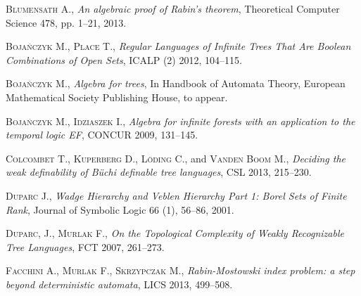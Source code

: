 \begin{thebibliography}{00}

\textsc{Blumensath} A., \emph{An algebraic proof of Rabin's theorem}, Theoretical Computer Science \textsc{478}, pp. 1--21, 2013.

\textsc{Boja\'nczyk} M., \textsc{Place} T., \emph{Regular Languages of Infinite Trees That Are Boolean Combinations of Open Sets}, ICALP (2) \textsc{2012}, 104--115.

\textsc{Boja\'nczyk} M., \emph{Algebra for trees}, In Handbook of Automata Theory, European
Mathematical Society Publishing House, to appear.

\textsc{Boja\'nczyk} M., \textsc{Idziaszek} I., \emph{Algebra for infinite forests with an
application to the temporal logic EF}, CONCUR \textsc{2009}, 131--145.


\textsc{Colcombet} T., \textsc{Kuperberg} D., \textsc{Löding} C., and \textsc{Vanden Boom} M., \emph{Deciding the weak definability of Büchi definable tree languages}, CSL \textsc{2013}, 215--230.


\textsc{Duparc} J., \emph{Wadge Hierarchy and Veblen Hierarchy Part 1: Borel Sets of Finite Rank}, Journal of Symbolic Logic \textsc{66} (1), 56--86, 2001.



\textsc{Duparc}, J., \textsc{Murlak} F., \emph{On the Topological Complexity of Weakly Recognizable Tree Languages}, FCT \textsc{2007}, 261--273.

\textsc{Facchini} A., \textsc{Murlak} F., \textsc{Skrzypczak} M.,  \emph{Rabin-Mostowski index problem: a step beyond deterministic automata}, LICS \textsc{2013}, 499--508.



\end{thebibliography}
